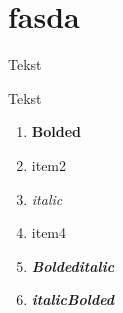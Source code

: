 \documentclass{report}
\begin{document}
    \section{fasda}
    Tekst

    Tekst


    \begin{enumerate}
        \item \textbf{Bolded}
        \item item2
        \item \textit{italic}
        \item item4
        \item \textbf{\textit{Boldeditalic}}
        \item \textit{\textbf{italicBolded}}
    \end{enumerate}
\end{document}
